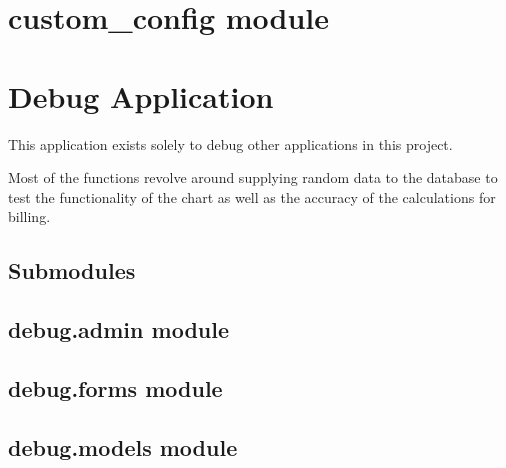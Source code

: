 \documentclass[letterpaper,10pt,english]{sphinxmanual}
\begin{document}
\section{custom\_config module}
\label{modules/custom_config:custom-config-module}\label{modules/custom_config::doc}\label{modules/custom_config:module-custom_config}

\begin{fulllineitems}
\label{modules/custom_config:custom_config.main}
\end{fulllineitems}



\section{Debug Application}
\label{modules/debug::doc}\label{modules/debug:debug-application}
This application exists solely to debug other applications in this
project.

Most of the functions revolve around supplying random data to the
database to test the functionality of the chart as well as the
accuracy of the calculations for billing.


\subsection{Submodules}
\label{modules/debug:submodules}

\subsection{debug.admin module}
\label{modules/debug:debug-admin-module}\label{modules/debug:module-debug.admin}

\subsection{debug.forms module}
\label{modules/debug:debug-forms-module}\label{modules/debug:module-debug.forms}

\subsection{debug.models module}
\label{modules/debug:debug-models-module}\label{modules/debug:module-debug.models}
\end{document}
